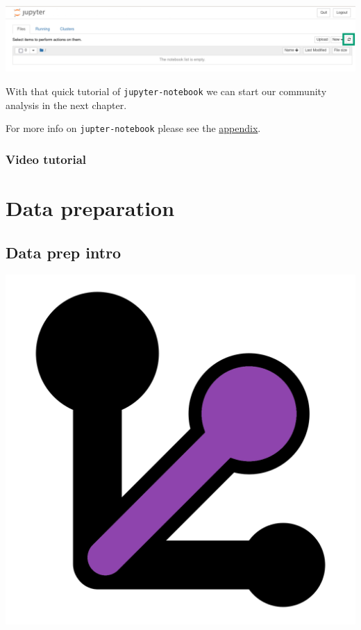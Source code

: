 \documentclass[
]{book}
\begin{document}
\includegraphics{figures/jupyter_notebook_refresh.png}

With that quick tutorial of \texttt{jupyter-notebook} we can start our community analysis in the next chapter.

For more info on \texttt{jupter-notebook} please see the \protect\hyperlink{jupyter_appendix}{appendix}.

\hypertarget{jup_vid_tut}{%
\section{Video tutorial}\label{jup_vid_tut}}

\hypertarget{part-data-preparation}{%
\part*{Data preparation}\label{part-data-preparation}}

\hypertarget{preprocess_section}{%
\chapter{Data prep intro}\label{preprocess_section}}

\includegraphics{figures/half_tablespoon.png}
\end{document}
